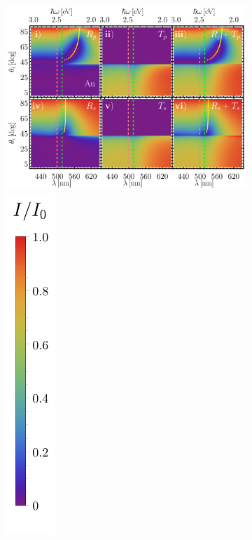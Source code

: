 \begin{figure}[h!]\centering
	\begin{subfigure}{.01\linewidth}\caption{}\label{sfig:RT-4}\vspace{6.5cm}\end{subfigure}
	\begin{subfigure}{.7\linewidth}\hspace*{-.5em}
	\includegraphics[scale=.58]{2-Resultados/figs/10-RT-AuAg/0-2D_Grid_1.png}%
	\includegraphics[scale=.89, trim={00 -5 00 00}, clip]{2-Resultados/figs/0-IBar_v}

\end{subfigure}
\end{figure}
